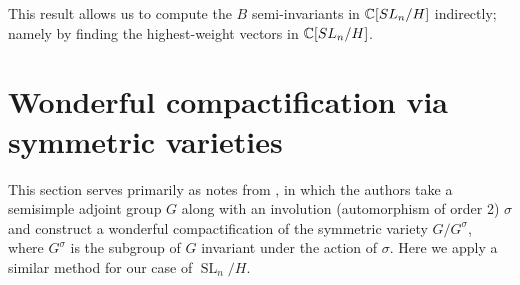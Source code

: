 \documentclass{../mathnotes}
\DeclareMathOperator{\SL}{SL}
\begin{document}
This result allows us to compute the $B$ semi-invariants in $\mathbb{C}[SL_n/H]$ indirectly; namely by finding the highest-weight vectors in $\mathbb{C}[SL_n/H]$.


\section{Wonderful compactification via symmetric varieties}

This section serves primarily as notes from \cite{de1983}, in which the authors take a semisimple adjoint group $G$ along with 
an involution (automorphism of order 2) $\sigma$ and construct a wonderful compactification of the symmetric variety $G/G^{\sigma}$,
where $G^{\sigma}$ is the subgroup of $G$ invariant under the action of $\sigma$. Here we apply a similar method for our case
of $\SL_n/H$.
\end{document}
